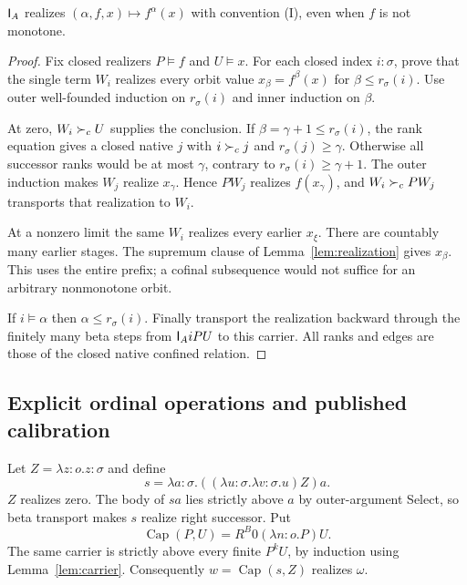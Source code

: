 \begin{theorem}\label{thm:iteration}
$\mathsf I_A$ realizes $(\alpha,f,x)\mapsto f^\alpha(x)$ with convention
\textup{(I)}, even when $f$ is not monotone.
\end{theorem}
\begin{proof}
Fix closed realizers $P\models f$ and $U\models x$. For each closed
index $i:\sigma$, prove that the single term $W_i$ realizes every
orbit value $x_\beta=f^\beta(x)$ for $\beta\le r_\sigma(i)$.
Use outer well-founded induction on $r_\sigma(i)$ and inner induction
on $\beta$.

At zero, $W_i\succ_c U$ supplies the conclusion. If
$\beta=\gamma+1\le r_\sigma(i)$, the rank equation gives a closed
native $j$ with $i\succ_c j$ and $r_\sigma(j)\ge\gamma$.
Otherwise all successor ranks would be at most $\gamma$, contrary
to $r_\sigma(i)\ge\gamma+1$. The outer induction makes $W_j$
realize $x_\gamma$. Hence $PW_j$ realizes $f(x_\gamma)$, and
$W_i\succ_c PW_j$ transports that realization to $W_i$.

At a nonzero limit the same $W_i$ realizes every earlier $x_\xi$.
There are countably many earlier stages. The supremum clause of
Lemma~\ref{lem:realization} gives $x_\beta$. This uses the entire
prefix; a cofinal subsequence would not suffice for an arbitrary
nonmonotone orbit.

If $i\models\alpha$ then $\alpha\le r_\sigma(i)$.
Finally transport the realization backward through the finitely
many beta steps from $\mathsf I_A iPU$ to this carrier. All ranks and
edges are those of the closed native confined relation.
\end{proof}

\subsection{Explicit ordinal operations and published calibration}
Let $Z=\lambda z:o.z:\sigma$ and define
\[
 s=\lambda a:\sigma.((\lambda u:\sigma.\lambda v:\sigma.u)Z)a.
\]
$Z$ realizes zero. The body of $sa$ lies strictly above $a$ by
outer-argument Select, so beta transport makes $s$ realize right
successor. Put
\[
 \operatorname{Cap}(P,U)=R^B0(\lambda n:o.P)U.
\]
The same carrier is strictly above every finite $P^kU$, by induction
using Lemma~\ref{lem:carrier}. Consequently
$w=\operatorname{Cap}(s,Z)$ realizes $\omega$.

